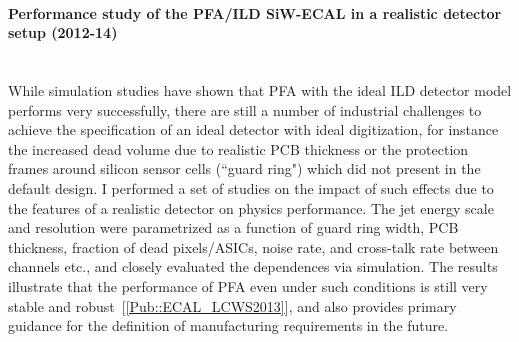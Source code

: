 \documentclass[12pt]{article}
\newcommand{\Subsubsection}[1]{\subsubsection*{#1}
\addcontentsline{toc}{subsubsection}{#1}}
\begin{document}
\paragraph{Performance study of the PFA/ILD SiW-ECAL in a realistic detector setup   (2012-14)}  \phantom{k} \vspace{3mm} \\
While simulation studies have shown that PFA with the ideal ILD detector model performs very successfully, 
there are still a number of industrial challenges to achieve the specification of an ideal detector with ideal digitization, 
for instance the increased dead volume due to realistic PCB thickness or the protection frames around silicon sensor cells (``guard ring") which did not present in the default design.
I performed a set of studies on the impact of such effects due to the features of a realistic detector on physics performance. 
The jet energy scale and resolution were parametrized as a function of guard ring width,
PCB thickness, fraction of dead pixels/ASICs, noise rate, and cross-talk rate between channels etc., 
and closely evaluated the dependences via simulation. 
The results illustrate that the performance of PFA even under such conditions is still very stable and robust~[\ref{Pub::ECAL_LCWS2013}], 
and also provides primary guidance for the definition of manufacturing requirements in the future. \\

\end{document}
